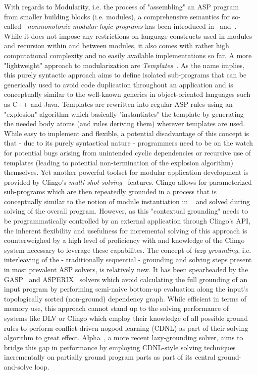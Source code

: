 With regards to Modularity, i.e. the process of "assembling" an ASP program from smaller building blocks (i.e. modules), a comprehensive semantics for so-called ~\emph{nonmonotonic modular logic programs} has been introduced in~\cite{mlp-krennw} and~\cite{mlp-2009}. While it does not impose any restrictions on language constructs used in modules and recursion within and between modules, it also comes with rather high computational complexity and no easily available implementations so far. A more "lightweight" approach to modularization are \emph{Templates}~\cite{templates}. As the name implies, this purely syntactic approach aims to define isolated sub-programs that can be generically used to avoid code duplication throughout an application and is conceptually similar to the well-known generics in object-oriented languages such as C++ and Java. Templates are rewritten into regular ASP rules using an "explosion" algorithm which basically "instantiates" the template by generating the needed body atoms (and rules deriving them) wherever templates are used. While easy to implement and flexible, a potential disadvantage of this concept is that - due to its purely syntactical nature - programmers need to be on the watch for potential bugs arising from unintended cyclic dependencies or recursive use of templates (leading to potential non-termination of the explosion algorithm) themselves.
Yet another powerful toolset for modular application development is provided by Clingo's \emph{multi-shot-solving}~\cite{clingo-multishot} features. Clingo allows for parameterized sub-programs which are then repeatedly grounded in a process that is conceptually similar to the notion of module instantiation in ~\cite{modules-compositionality} and solved during solving of the overall program. However, as this "contextual grounding" needs to be programmatically controlled by an external application through Clingo's API, the inherent flexibility and usefulness for incremental solving of this approach is counterweighed by a high level of proficiency with and knowledge of the Clingo system necessary to leverage these capabilites.
The concept of \emph{lazy grounding}, i.e. interleaving of the - traditionally sequential - grounding and solving steps present in most prevalent ASP solvers, is relatively new. It has been spearheaded by the GASP~\cite{gasp} and ASPERIX~\cite{asperix-fw-chain} solvers which avoid calculating the full grounding of an input program by performing semi-naive bottom-up evaluation along the input's topologically sorted (non-ground) dependency graph. While efficient in terms of memory use, this approach cannot stand up to the solving performance of systems like DLV or Clingo which employ their knowledge of all possible ground rules to perform conflict-driven nogood learning (CDNL) as part of their solving algorithm to great effect. Alpha~\cite{alpha}, a more recent lazy-grounding solver, aims to bridge this gap in performance by employing CDNL-style solving techniques~\cite{lazy-cdnl} incrementally on partially ground program parts as part of its central ground-and-solve loop.

